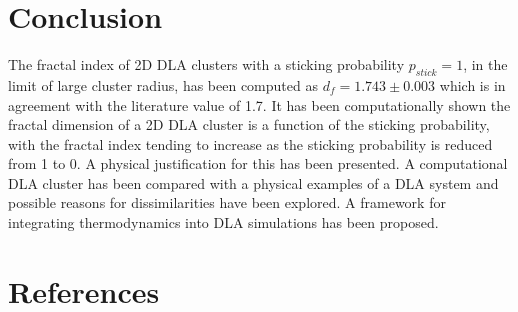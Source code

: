 \documentclass[11pt]{iopart}
\begin{document}
\section{Conclusion}
The fractal index of 2D DLA clusters with a sticking probability $p_{stick} = 1$, in the limit of large cluster radius, has been computed as $d_f = 1.743 \pm 0.003$ which is in agreement with the literature value of 1.7\cite{fractalindexref}. It has been computationally shown the fractal dimension of a 2D DLA cluster is a function of the sticking probability, with the fractal index tending to increase as the sticking probability is reduced from 1 to 0. A physical justification for this has been presented. A computational DLA cluster has been compared with a physical examples of a DLA system and possible reasons for dissimilarities have been explored. A framework for integrating thermodynamics into DLA simulations has been proposed.

\section*{References}


\end{document}
